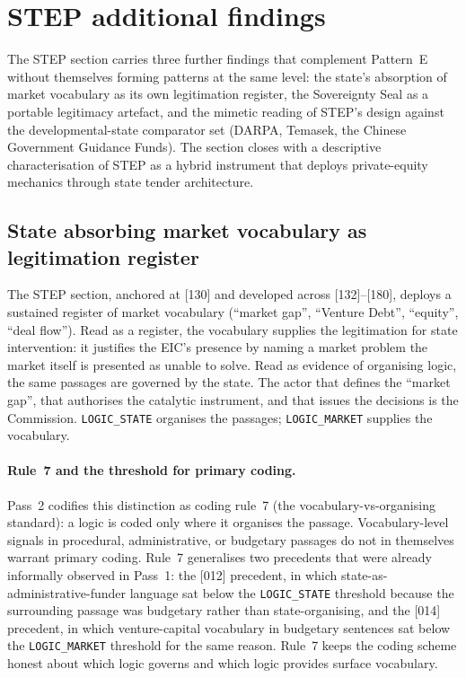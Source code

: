 \section{STEP additional findings}
\label{sec:res-step-additional}

The STEP section carries three further findings that complement
Pattern~E without themselves forming patterns at the same level: the
state's absorption of market vocabulary as its own legitimation
register, the Sovereignty Seal as a portable legitimacy artefact,
and the mimetic reading of STEP's design against the
developmental-state comparator set (DARPA, Temasek, the Chinese
Government Guidance Funds). The section closes with a descriptive
characterisation of STEP as a hybrid instrument that deploys
private-equity mechanics through state tender architecture.

\subsection{State absorbing market vocabulary as legitimation
register}
\label{sec:res-step-vocabulary}

The STEP section, anchored at [130] and developed across
[132]--[180], deploys a sustained register of market vocabulary
(\enquote{market gap}, \enquote{Venture Debt}, \enquote{equity},
\enquote{deal flow}). Read as a register, the vocabulary supplies
the legitimation for state intervention: it justifies the EIC's
presence by naming a market problem the market itself is presented
as unable to solve. Read as evidence of organising logic, the same
passages are governed by the state. The actor that defines the
\enquote{market gap}, that authorises the catalytic instrument, and
that issues the decisions is the Commission. \texttt{LOGIC\_STATE}
organises the passages; \texttt{LOGIC\_MARKET} supplies the
vocabulary.

\paragraph{Rule~7 and the threshold for primary coding.}
Pass~2 codifies this distinction as coding rule~7 (the
vocabulary-vs-organising standard): a logic is coded only where it
organises the passage. Vocabulary-level signals in procedural,
administrative, or budgetary passages do not in themselves warrant
primary coding. Rule~7 generalises two precedents that were already
informally observed in Pass~1: the [012] precedent, in which
state-as-administrative-funder language sat below the
\texttt{LOGIC\_STATE} threshold because the surrounding passage was
budgetary rather than state-organising, and the [014] precedent, in
which venture-capital vocabulary in budgetary sentences sat below the
\texttt{LOGIC\_MARKET} threshold for the same reason. Rule~7 keeps
the coding scheme honest about which logic governs and which logic
provides surface vocabulary.

